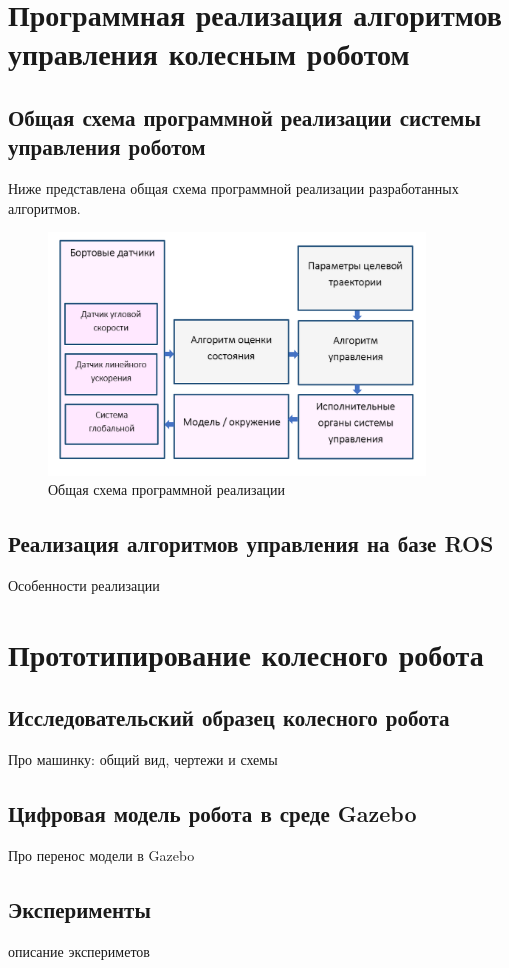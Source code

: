 \documentclass[a4paper,12pt]{article}
\begin{document}
\section{Программная реализация алгоритмов управления колесным роботом}
\subsection{Общая схема программной реализации системы управления роботом}
Ниже представлена общая схема программной реализации разработанных алгоритмов.
\begin{figure}[h!]
	\centering
	\includegraphics[width=10cm,clip]{pic/common_code_scheme}
	\caption{Общая схема программной реализации}
	\label{pic:common_code_scheme}
\end{figure}

\subsection{Реализация алгоритмов управления на базе ROS}
Особенности реализации

\section{Прототипирование колесного робота}
\subsection{Исследовательский образец колесного робота}
Про машинку: общий вид, чертежи и схемы
\subsection{Цифровая модель робота в среде Gazebo}
Про перенос модели в Gazebo
\subsection{Эксперименты}
описание экспериметов


\section{}
\end{document}
